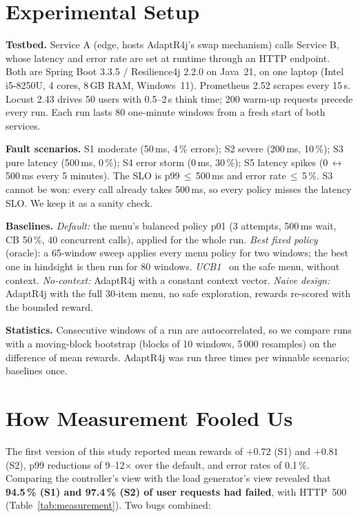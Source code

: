 \documentclass[journal]{IEEEtran}
\newcommand{\adaptr}{AdaptR4j\xspace}
\newcommand{\rFJ}{Resilience4j\xspace}
\begin{document}
\section{Experimental Setup}
\label{sec:setup}

\textbf{Testbed.} Service A (edge, hosts \adaptr's swap mechanism) calls Service B, whose
latency and error rate are set at runtime through an HTTP endpoint. Both are Spring Boot
3.3.5 / \rFJ 2.2.0 on Java~21, on one laptop (Intel i5-8250U, 4 cores,
8\,GB RAM, Windows~11). Prometheus 2.52 scrapes every 15\,s. Locust 2.43 drives 50 users
with 0.5--2\,s think time; 200 warm-up requests precede every run. Each run lasts 80 one-minute
windows from a fresh start of both services.

\textbf{Fault scenarios.} S1 moderate (50\,ms, 4\,\% errors); S2 severe (200\,ms, 10\,\%);
S3 pure latency (500\,ms, 0\,\%); S4 error storm (0\,ms, 30\,\%); S5 latency spikes
(0\,$\leftrightarrow$\,500\,ms every 5 minutes). The SLO is p99\,$\le$\,500\,ms and
error rate\,$\le$\,5\,\%. S3 cannot be won: every call already takes 500\,ms, so every policy
misses the latency SLO. We keep it as a sanity check.

\textbf{Baselines.} \emph{Default:} the menu's balanced policy p01 (3 attempts, 500\,ms wait,
CB 50\,\%, 40 concurrent calls), applied for the whole run. \emph{Best fixed policy} (oracle):
a 65-window sweep applies every menu policy for two windows; the best one in hindsight is then
run for 80 windows. \emph{UCB1}~\cite{auer2002} on the safe menu, without context.
\emph{No-context:} \adaptr with a constant context vector. \emph{Naive design:} \adaptr with the
full 30-item menu, no safe exploration, rewards re-scored with the bounded reward.

\textbf{Statistics.} Consecutive windows of a run are autocorrelated, so we compare runs with a
moving-block bootstrap (blocks of 10 windows, 5\,000 resamples) on the difference of mean rewards.
\adaptr was run three times per winnable scenario; baselines once.

\section{How Measurement Fooled Us}
\label{sec:measurement}

The first version of this study reported mean rewards of $+0.72$ (S1) and $+0.81$ (S2), p99
reductions of 9--12$\times$ over the default, and error rates of 0.1\,\%. Comparing the
controller's view with the load generator's view revealed that \textbf{94.5\,\% (S1) and
97.4\,\% (S2) of user requests had failed}, with HTTP~500 (Table~\ref{tab:measurement}).
Two bugs combined:
\end{document}
